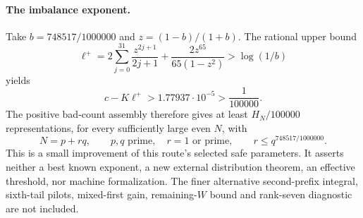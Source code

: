 \paragraph{The imbalance exponent.}
Take $b=748517/1000000$ and $z=(1-b)/(1+b)$. The rational upper bound
\[
 \ell^+=2\sum_{j=0}^{31}\frac{z^{2j+1}}{2j+1}
       +\frac{2z^{65}}{65(1-z^2)}>\log(1/b)
\]
yields
\[
 c-K\ell^+>1.77937\cdot10^{-5}>\frac1{100000}.
\]
The positive bad-count assembly therefore gives at least $H_N/100000$
representations, for every sufficiently large even $N$, with
\[
 N=p+rq,\qquad p,q\text{ prime},\quad r=1\text{ or prime},
 \qquad r\le q^{748517/1000000}.
\]
This is a small improvement of this route's selected safe parameters.
It asserts neither a best known exponent, a new external distribution
theorem, an effective threshold, nor machine formalization. The finer
alternative second-prefix integral, sixth-tail pilots, mixed-first
gain, remaining-$W$ bound and rank-seven diagnostic are not included.
